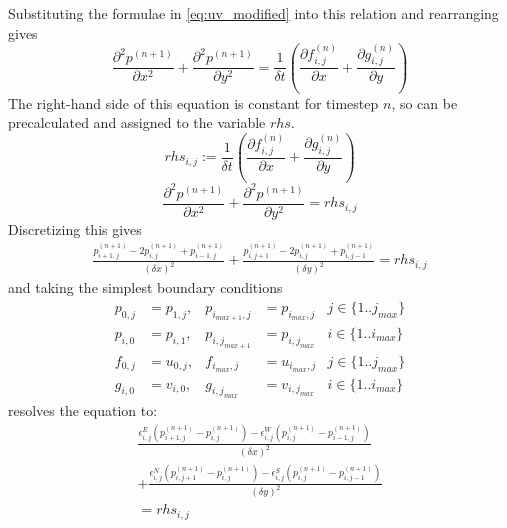 Substituting the formulae in \cref{eq:uv_modified} into this relation and rearranging gives
\begin{equation}
    \frac{\partial^2{p^{(n+1)}}}{\partial{x^2}} + \frac{\partial^2{p^{(n+1)}}}{\partial{y^2}} = \frac{1}{\delta{t}}\left(\frac{\partial{f^{(n)}_{i,j}}}{\partial{x}} + \frac{\partial{g^{(n)}_{i,j}}}{\partial{y}}\right)
\end{equation}
The right-hand side of this equation is constant for timestep $n$, so can be precalculated and assigned to the variable $rhs$.
\begin{equation}
rhs_{i,j} := \frac{1}{\delta{t}}\left(\frac{\partial{f^{(n)}_{i,j}}}{\partial{x}} + \frac{\partial{g^{(n)}_{i,j}}}{\partial{y}}\right)
\end{equation}
\begin{equation}
\frac{\partial^2{p^{(n+1)}}}{\partial{x^2}} + \frac{\partial^2{p^{(n+1)}}}{\partial{y^2}} = rhs_{i,j}
\end{equation}
Discretizing this gives
\newcommand{\discretized}[4]{#1^{#2}_{#3,#4}}
\newcommand{\pdisc}[3]{\discretized{p}{(#1)}{#2}{#3}}
\newcommand{\fdisc}[3]{\discretized{f}{(#1)}{#2}{#3}}
\newcommand{\gdisc}[3]{\discretized{g}{(#1)}{#2}{#3}}
\newcommand{\ebounds}[1]{\discretized{\epsilon}{#1}{i}{j}}
\begin{multline}
    \frac{\pdisc{n+1}{i+1}{j} - 2\pdisc{n+1}{i}{j} + \pdisc{n+1}{i-1}{j}}
    {(\delta{x})^2} + 
    \frac{\pdisc{n+1}{i}{j+1} - 2\pdisc{n+1}{i}{j} + \pdisc{n+1}{i}{j-1}}
    {(\delta{y})^2}
    = rhs_{i,j}
\end{multline}
and taking the simplest boundary conditions\cite{book:griebel1998numerical}
\begin{align}
    p_{0,j} &= p_{1,j}, & p_{i_{max+1},j} &= p_{i_{max},j} & j \in \{1..j_{max}\} \\
    p_{i,0} &= p_{i,1}, & p_{i,j_{max+1}} &= p_{i,j_{max}} & i \in \{1..i_{max}\} \\
    f_{0,j} &= u_{0,j}, & f_{i_{max},j} &= u_{i_{max},j} & j \in \{1..j_{max}\} \\
    g_{i,0} &= v_{i,0}, & g_{i,j_{max}} &= v_{i,j_{max}} & i \in \{1..i_{max}\}
\end{align}
resolves the equation to:
\begin{multline}
    \frac{\ebounds{E}(\pdisc{n+1}{i+1}{j} - \pdisc{n+1}{i}{j}) - \ebounds{W}(\pdisc{n+1}{i}{j} - \pdisc{n+1}{i-1}{j})}
    {(\delta{x})^2} \\
    + \frac{\ebounds{N}(\pdisc{n+1}{i}{j+1} - \pdisc{n+1}{i}{j}) - \ebounds{S}(\pdisc{n+1}{i}{j} - \pdisc{n+1}{i}{j-1})}
    {(\delta{y})^2}\\
    = rhs_{i,j}
    \label{eq:poisson_pre_sor}
\end{multline}
